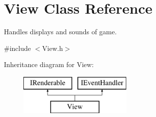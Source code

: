 \hypertarget{class_view}{}\section{View Class Reference}
\label{class_view}


Handles display\textquotesingle{}s and sounds of game.  




{\ttfamily \#include $<$View.\+h$>$}

Inheritance diagram for View\+:\begin{figure}[H]
\begin{center}
\leavevmode
\includegraphics[height=2.000000cm]{class_view}
\end{center}
\end{figure}
